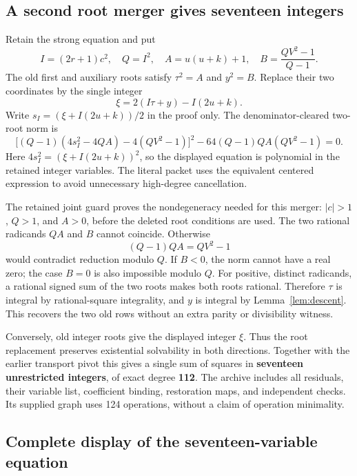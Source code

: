 \documentclass[11pt]{article}
\theoremstyle{remark}
\begin{document}
\subsection{A second root merger gives seventeen integers}
Retain the strong equation and put
\[
 I=(2r+1)c^2,\quad Q=I^2,\quad
 A=u(u+k)+1,\quad B=\frac{QV^2-1}{Q-1}.
\]
The old first and auxiliary roots satisfy $\tau^2=A$ and $y^2=B$.
Replace their two coordinates by the single integer
\[
 \xi=2(I\tau+y)-I(2u+k).
\]
Write $s_I=(\xi+I(2u+k))/2$ in the proof only. The denominator-cleared
two-root norm is
\begin{equation}\label{eq:integernorm}
 \bigl[(Q-1)(4s_I^2-4QA)-4(QV^2-1)\bigr]^2
 -64(Q-1)QA(QV^2-1)=0.
\end{equation}
Here $4s_I^2=(\xi+I(2u+k))^2$, so the displayed equation is polynomial
in the retained integer variables. The literal packet uses the equivalent
centered expression to avoid unnecessary high-degree cancellation.

The retained joint guard proves the nondegeneracy needed for this merger:
$|c|>1$, $Q>1$, and $A>0$, before the deleted root conditions are used.
The two rational radicands $QA$ and $B$ cannot coincide. Otherwise
\[
 (Q-1)QA=QV^2-1
\]
would contradict reduction modulo $Q$. If $B<0$, the norm cannot have
a real zero; the case $B=0$ is also impossible modulo $Q$. For positive,
distinct radicands, a rational signed sum of the two roots makes both
roots rational. Therefore $\tau$ is integral by rational-square
integrality, and $y$ is integral by Lemma~\ref{lem:descent}. This recovers
the two old rows without an extra parity or divisibility witness.

Conversely, old integer roots give the displayed integer $\xi$. Thus the
root replacement preserves existential solvability in both directions.
Together with the earlier transport pivot this gives a single sum of
squares in \textbf{seventeen unrestricted integers}, of exact degree
\textbf{112}. The archive includes all residuals, their variable list,
coefficient binding, restoration maps, and independent checks. Its supplied graph uses 124 operations, without a claim of operation minimality.

\subsection{Complete display of the seventeen-variable equation}
\end{document}

